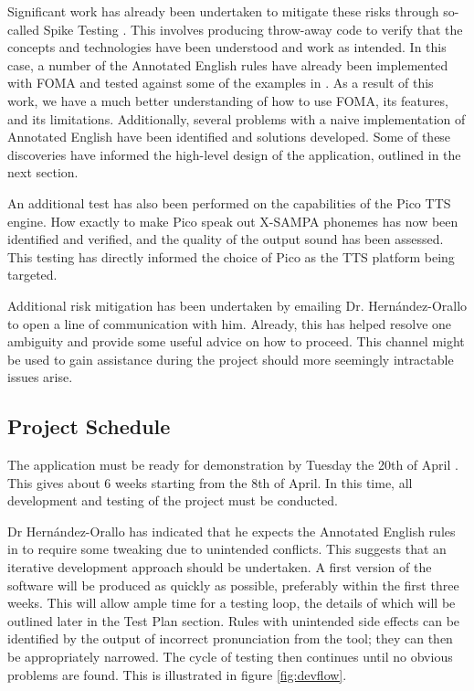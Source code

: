 \documentclass[fleqn]{llncs}
\begin{document}
Significant work has already been undertaken to mitigate these risks through so-called Spike Testing \cite{agile}. This involves producing throw-away code to verify that the concepts and technologies have been understood and work as intended. In this case, a number of the Annotated English rules have already been implemented with FOMA and tested against some of the examples in \cite{jose}. As a result of this work, we have a much better understanding of how to use FOMA, its features, and its limitations. Additionally, several problems with a naive implementation of Annotated English have been identified and solutions developed. Some of these discoveries have informed the high-level design of the application, outlined in the next section.

An additional test has also been performed on the capabilities of the Pico TTS engine. How exactly to make Pico speak out X-SAMPA phonemes has now been identified and verified, and the quality of the output sound has been assessed. This testing has directly informed the choice of Pico as the TTS platform being targeted.

Additional risk mitigation has been undertaken by emailing Dr. Hern{\'a}ndez-Orallo to open a line of communication with him. Already, this has helped resolve one ambiguity and provide some useful advice on how to proceed. This channel might be used to gain assistance during the project should more seemingly intractable issues arise.

\subsection{Project Schedule}
The application must be ready for demonstration by Tuesday the 20th of April \cite{unitguide}. This gives about 6 weeks starting from the 8th of April. In this time, all development and testing of the project must be conducted.

Dr Hern{\'a}ndez-Orallo has indicated \cite{email} that he expects the Annotated English rules in \cite{jose} to require some tweaking due to unintended conflicts. This suggests that an iterative development approach should be undertaken. A first version of the software will be produced as quickly as possible, preferably within the first three weeks. This will allow ample time for a testing loop, the details of which will be outlined later in the Test Plan section. Rules with unintended side effects can be identified by the output of incorrect pronunciation from the tool; they can then be appropriately narrowed. The cycle of testing then continues until no obvious problems are found. This is illustrated in figure \ref{fig:devflow}.
\end{document}
